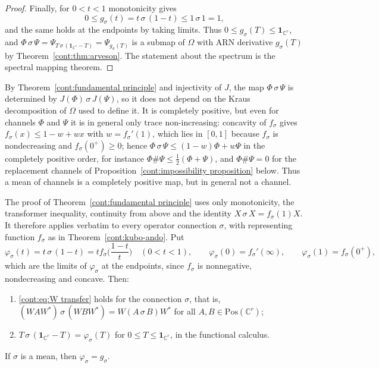 \begin{proof}
Finally, for $0<t<1$ monotonicity gives
\[
0\leq g_\sigma(t)=t\,\sigma\,(1-t)\leq 1\,\sigma\,1=1,
\]
and the same holds at the endpoints by taking limits. Thus $0\leq g_\sigma(T)\leq\mathbf{1}_{\mathbb{C}^r}$, and $\Phi\,\sigma\,\Psi=\Psi_{T\,\sigma\,(\mathbf{1}_{\mathbb{C}^r}-T)}=\Psi_{g_\sigma(T)}$ is a submap of $\Omega$ with ARN derivative $g_\sigma(T)$ by Theorem~\ref{cont:thm:arveson}. The statement about the spectrum is the spectral mapping theorem.
\end{proof}

By Theorem~\ref{cont:fundamental principle} and injectivity of $J$, the map $\Phi\,\sigma\,\Psi$ is determined by $J(\Phi)\,\sigma\,J(\Psi)$, so it does not depend on the Kraus decomposition of $\Omega$ used to define it. It is completely positive, but even for channels $\Phi$ and $\Psi$ it is in general only trace non-increasing: concavity of $f_\sigma$ gives $f_\sigma(x)\leq1-w+wx$ with $w=f_\sigma'(1)$, which lies in $[0,1]$ because $f_\sigma$ is nondecreasing and $f_\sigma(0^+)\geq0$; hence $\Phi\,\sigma\,\Psi\leq(1-w)\Phi+w\Psi$ in the completely positive order, for instance $\Phi\#\Psi\leq\frac12(\Phi+\Psi)$, and $\Phi\#\Psi=0$ for the replacement channels of Proposition~\ref{cont:impossibility proposition} below. Thus a mean of channels is a completely positive map, but in general not a channel.

\begin{remark}\label{cont:rem:connections}
The proof of Theorem~\ref{cont:fundamental principle} uses only monotonicity, the transformer inequality, continuity from above and the identity $X\,\sigma\,X=f_\sigma(1)X$. It therefore applies verbatim to every operator connection $\sigma$, with representing function $f_\sigma$ as in Theorem~\ref{cont:kubo-ando}. Put
\[
\varphi_\sigma(t)=t\,\sigma\,(1-t)=tf_\sigma\Big(\frac{1-t}{t}\Big)\quad(0<t<1),\qquad\varphi_\sigma(0)=f_\sigma'(\infty),\qquad\varphi_\sigma(1)=f_\sigma(0^+),
\]
which are the limits of $\varphi_\sigma$ at the endpoints, since $f_\sigma$ is nonnegative, nondecreasing and concave. Then:
\begin{enumerate}
\item \eqref{cont:eq:W transfer} holds for the connection $\sigma$, that is, $(WAW^*)\,\sigma\,(WBW^*)=W(A\,\sigma\,B)W^*$ for all $A,B\in\mathrm{Pos}(\mathbb{C}^r)$;
\item $T\,\sigma\,(\mathbf{1}_{\mathbb{C}^r}-T)=\varphi_\sigma(T)$ for $0\leq T\leq\mathbf{1}_{\mathbb{C}^r}$, in the functional calculus.
\end{enumerate}
If $\sigma$ is a mean, then $\varphi_\sigma=g_\sigma$.
\end{remark}
 
